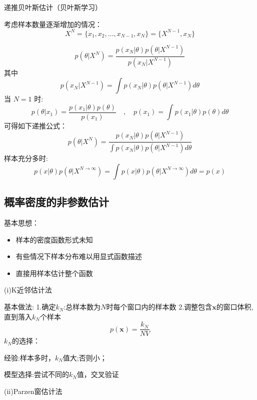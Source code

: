\documentclass{article}
\begin{document}
递推贝叶斯估计（贝叶斯学习）

考虑样本数量逐渐增加的情况：
\[
X^N = \{x_1, x_2, \dots, x_{N-1}, x_N\} = \{X^{N-1}, x_N\}
\]

\[
p(\theta|X^N) = \frac{p(x_N|\theta)p(\theta|X^{N-1})}{p(x_N|X^{N-1})}
\]
其中
\[
p(x_N|X^{N-1}) = \int p(x_N|\theta)p(\theta|X^{N-1}) d\theta
\]
当 $N=1$ 时:
\[
p(\theta|x_1) = \frac{p(x_1|\theta)p(\theta)}{p(x_1)} \quad , \quad p(x_1) = \int p(x_1|\theta)p(\theta) d\theta
\]
可得如下递推公式：
\[
p(\theta|X^N) = \frac{p(x_N|\theta)p(\theta|X^{N-1})}{\int p(x_N|\theta)p(\theta|X^{N-1}) d\theta}
\]
样本充分多时:
\[
p(x|\theta) p(\theta|X^{N \to \infty}) = \int p(x|\theta)p(\theta|X^{N \to \infty}) d\theta = p(x)
\]

\subsection*{概率密度的非参数估计}

基本思想：

\begin{itemize}
  \item 样本的密度函数形式未知
  \item 有些情况下样本分布难以用显式函数描述
  \item 直接用样本估计整个函数
\end{itemize}

(i)K近邻估计法

基本做法:
1.确定$k_N$:总样本数为$N$时每个窗口内的样本数
2.调整包含$\mathbf{x}$的窗口体积,直到落入$k_N$个样本\[p(\mathbf{x})=\frac{k_N}{NV}\]
$k_N$的选择：

经验:样本多时，$k_N$值大;否则小；

模型选择:尝试不同的$k_N$值，交叉验证

(ii)Parzen窗估计法
\end{document}
